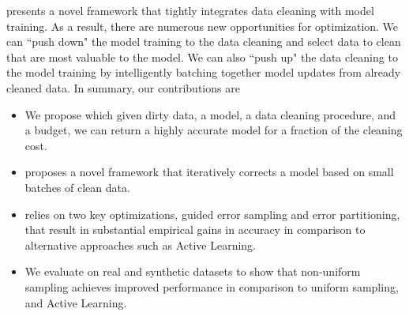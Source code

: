 \sys presents a novel framework that tightly integrates data cleaning with model training.
As a result, there are numerous new opportunities for optimization.
We can ``push down" the model training to the data cleaning and select data to clean that are most valuable to the model.
We can also ``push up" the data cleaning to the model training by intelligently batching together model updates from already cleaned data.
In summary, our contributions are
\begin{itemize}[noitemsep]
\item We propose \sysfull which given dirty data, a model, a data cleaning procedure, and a budget, we can return a highly accurate model for a fraction of the cleaning cost.
\item \sys proposes a novel framework that iteratively corrects a model based on small batches of clean data.
\item \sys relies on two key optimizations, guided error sampling and error partitioning, that result in substantial empirical gains in accuracy in comparison to alternative approaches such as Active Learning.
\item We evaluate \sysfull on real and synthetic datasets to show that non-uniform sampling achieves improved performance in comparison to uniform sampling, and Active Learning.
\end{itemize}






